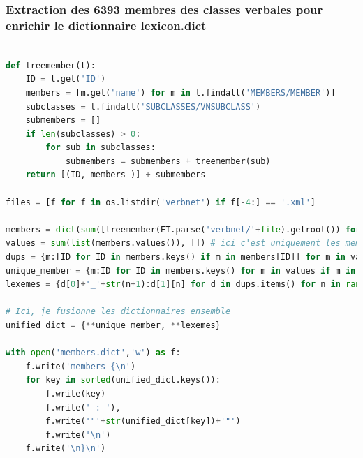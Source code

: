 

\subsubsection{Extraction des 6393 membres des classes verbales pour enrichir le dictionnaire lexicon.dict}

\begin{lstlisting}[language=Python, caption = code pour ajouter des lexèmes à lexicon.dict]

def treemember(t):
    ID = t.get('ID')
    members = [m.get('name') for m in t.findall('MEMBERS/MEMBER')]
    subclasses = t.findall('SUBCLASSES/VNSUBCLASS')
    submembers = []
    if len(subclasses) > 0:
        for sub in subclasses:
            submembers = submembers + treemember(sub)
    return [(ID, members )] + submembers

files = [f for f in os.listdir('verbnet') if f[-4:] == '.xml']

members = dict(sum([treemember(ET.parse('verbnet/'+file).getroot()) for file in files], [])) # ici on a classe : [membre,...]
values = sum(list(members.values()), []) # ici c'est uniquement les membres, sans infos sur leur classe
dups = {m:[ID for ID in members.keys() if m in members[ID]] for m in values if values.count(m)>1}
unique_member = {m:ID for ID in members.keys() for m in values if m in members[ID] and values.count(m)==1}
lexemes = {d[0]+'_'+str(n+1):d[1][n] for d in dups.items() for n in range(len(d[1]))}

# Ici, je fusionne les dictionnaires ensemble
unified_dict = {**unique_member, **lexemes}

with open('members.dict','w') as f:
    f.write('members {\n')
    for key in sorted(unified_dict.keys()):
        f.write(key)
        f.write(' : '),
        f.write('"'+str(unified_dict[key])+'"')
        f.write('\n')
    f.write('\n}\n')

\end{lstlisting}

